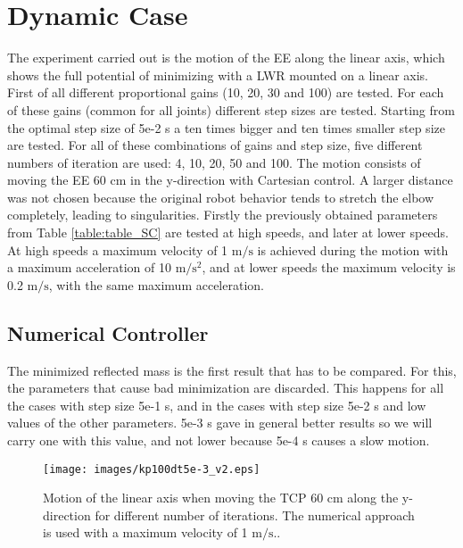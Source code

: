 \section{Dynamic Case}
\label{sec:dynamic_case}


The  experiment carried out is the motion of the EE along the linear axis, which shows the full potential of minimizing with a LWR mounted on a linear axis.
First of all different proportional gains (10, 20, 30 and 100) are tested. For each of these gains (common for all joints) different step sizes are tested. Starting from the optimal step size of 5e-2 s a ten times bigger and ten times smaller step size are tested. For all of these combinations of gains and step size, five different numbers of iteration are used: 4, 10, 20, 50 and 100.
The motion consists of moving the EE 60 cm  in the y-direction with Cartesian control.
A larger distance was not chosen  because the original robot behavior tends to stretch the elbow completely,  leading to singularities. 
 Firstly the previously obtained  parameters from Table 	\ref{table:table_SC} are tested at high speeds, and later at lower speeds. At high speeds a maximum velocity of 1 $\mathrm{m/s}$ is achieved during the motion with a maximum acceleration of 10 $\mathrm{m/s^{2}}$, and at lower speeds the maximum velocity is 0.2 $\mathrm{m/s}$, with the same maximum acceleration.





\subsection{Numerical Controller}




The minimized reflected mass is the first result that has to be compared. For this, the parameters that cause bad minimization are discarded. This happens for all the cases with step size 5e-1 s, and in the cases with step size  5e-2 s and low values of the other parameters. 5e-3 s gave in general better results so we will carry one with this value, and not lower because 5e-4 s causes a  slow motion.
\begin{figure}[!htb]
	\centerline{
		\texttt{[image: images/kp100dt5e-3\_v2.eps]}}
	\caption{Motion of the linear axis when moving the TCP 60 cm along the y-direction for different number of iterations. The numerical approach is used with a maximum velocity of 1 $\mathrm{m/s}$..}
	\label{fig:kp100dt5e-3}
\end{figure}

